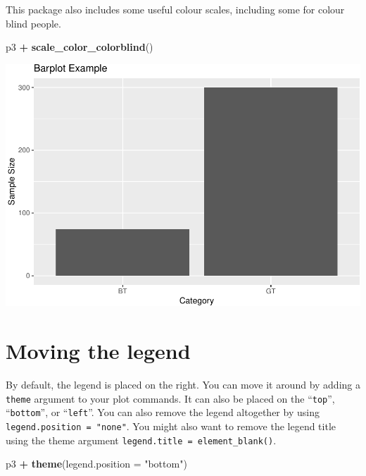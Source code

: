 \documentclass[
  a4paperpaper,
]{book}
\newenvironment{Shaded}{\begin{snugshade}}{\end{snugshade}}
\newcommand{\DataTypeTok}[1]{\textcolor[rgb]{0.13,0.29,0.53}{#1}}
\newcommand{\KeywordTok}[1]{\textcolor[rgb]{0.13,0.29,0.53}{\textbf{#1}}}
\newcommand{\NormalTok}[1]{#1}
\newcommand{\OperatorTok}[1]{\textcolor[rgb]{0.81,0.36,0.00}{\textbf{#1}}}
\newcommand{\StringTok}[1]{\textcolor[rgb]{0.31,0.60,0.02}{#1}}
\begin{document}
This package also includes some useful colour scales, including some for colour blind people.

\begin{Shaded}
\begin{Highlighting}[]
\NormalTok{p3 }\OperatorTok{+}\StringTok{ }
\StringTok{  }\KeywordTok{scale\_color\_colorblind}\NormalTok{()}
\end{Highlighting}
\end{Shaded}

\begin{center}\includegraphics{BB852_files/figure-latex/unnamed-chunk-125-1} \end{center}

\hypertarget{moving-the-legend}{%
\section{Moving the legend}\label{moving-the-legend}}

By default, the legend is placed on the right. You can move it around by adding a \texttt{theme} argument to your plot commands. It can also be placed on the ``\texttt{top}'', ``\texttt{bottom}'', or ``\texttt{left}''. You can also remove the legend altogether by using \texttt{legend.position\ =\ "none"}. You might also want to remove the legend title using the theme argument \texttt{legend.title\ =\ element\_blank()}.

\begin{Shaded}
\begin{Highlighting}[]
\NormalTok{p3 }\OperatorTok{+}\StringTok{ }
\StringTok{  }\KeywordTok{theme}\NormalTok{(}\DataTypeTok{legend.position  =} \StringTok{"bottom"}\NormalTok{)}
\end{Highlighting}
\end{Shaded}
\end{document}
